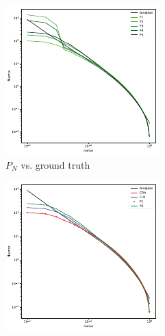 \documentclass{egpubl}
\begin{document}
\begin{figure}[!t]
\centering
\begin{subfigure}{0.47\columnwidth}
\includegraphics[width=\columnwidth]{pointsource_pn_small.pdf}
\caption{$P_N$ vs. ground truth}
\label{fig:pointsource_pn}
\end{subfigure}%
\hspace{0.05\columnwidth}
\begin{subfigure}{0.47\columnwidth}
\includegraphics[width=\columnwidth]{pointsource_p5_small.pdf}

\end{subfigure}
\end{figure}
\end{document}
